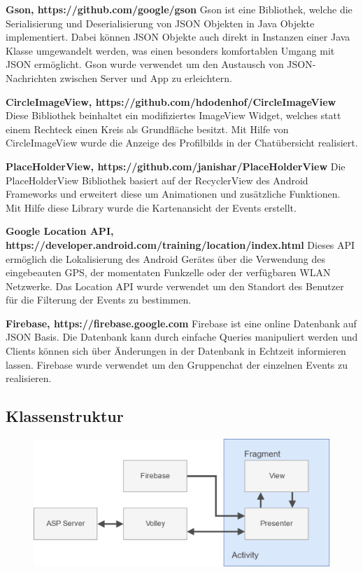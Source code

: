 \documentclass{scrartcl}
\begin{document}
\textbf{Gson, https://github.com/google/gson} \newline
Gson ist eine Bibliothek, welche die Serialisierung und Deserialisierung von
JSON Objekten in Java Objekte implementiert. Dabei können JSON Objekte auch
direkt in Instanzen einer Java Klasse umgewandelt werden, was einen besonders
komfortablen Umgang mit JSON ermöglicht. Gson wurde verwendet um den
Austausch von JSON-Nachrichten zwischen Server und App zu erleichtern.

\textbf{CircleImageView, https://github.com/hdodenhof/CircleImageView} \newline
Diese Bibliothek beinhaltet ein modifiziertes ImageView Widget, welches statt
einem Rechteck einen Kreis als Grundfläche besitzt. Mit Hilfe von
CircleImageView wurde die Anzeige des Profilbilds in der Chatübersicht
realisiert.

\textbf{PlaceHolderView, https://github.com/janishar/PlaceHolderView} \newline
Die PlaceHolderView Bibliothek basiert auf der RecyclerView des Android
Frameworks und erweitert diese um Animationen und zusätzliche Funktionen. Mit
Hilfe diese Library wurde die Kartenansicht der Events erstellt.

\textbf{Google Location API,
https://developer.android.com/training/location/index.html} \newline
Dieses API ermöglich die Lokalisierung des Android Gerätes über die Verwendung
des eingebeauten GPS, der momentaten Funkzelle oder der verfügbaren WLAN
Netzwerke. Das Location API wurde verwendet um den Standort des Benutzer für die
Filterung der Events zu bestimmen.

\textbf{Firebase, https://firebase.google.com} \newline
Firebase ist eine online Datenbank auf JSON Basis. Die Datenbank kann durch
einfache Queries manipuliert werden und Clients können sich über Änderungen in
der Datenbank in Echtzeit informieren lassen. Firebase wurde verwendet um
den Gruppenchat der einzelnen Events zu realisieren.

\subsection{Klassenstruktur}

\begin{figure}[h!tbp]
  \includegraphics[width=\textwidth]{img/architecture}
\end{figure}
\end{document}
